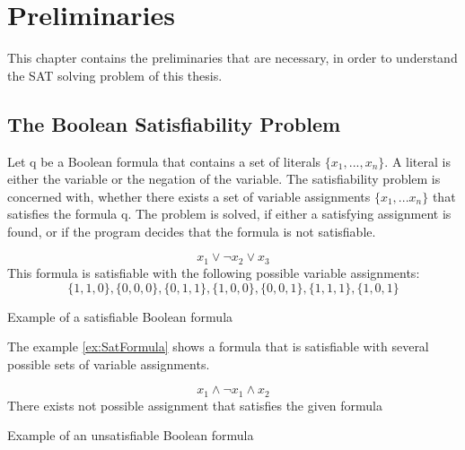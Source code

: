 
\chapter{Preliminaries}
\label{ch:Preliminaries}

This chapter contains the preliminaries that are necessary, in order to understand the SAT solving problem of this thesis.

\section{The Boolean Satisfiability Problem}
Let q be a Boolean formula that contains a set of literals $\{x_1,...,x_n\}$. A literal is either the variable or the negation of the variable. The satisfiability problem is concerned with, whether there exists a set of variable assignments $\{x_1,...x_n\}$ that satisfies the formula q. The problem is solved, if either a satisfying assignment is found, or if the program decides that the formula is not satisfiable. \cite{biere2009handbook}

\begin{example}
\begin{leftbar}
\begin{displaymath}
x_1 \vee \neg x_2 \vee x_3
\end{displaymath}
This formula is satisfiable with the following possible variable assignments:
\begin{displaymath}
\{1,1,0\},\{0,0,0\},\{0,1,1\},\{1,0,0\},\{0,0,1\},\{1,1,1\},\{1,0,1\}
\end{displaymath}
\end{leftbar}
\caption{Example of a satisfiable Boolean formula}
\label{ex:SatFormula}
\end{example}

The example \ref{ex:SatFormula} shows a formula that is satisfiable with several possible sets of variable assignments.

\begin{example}
\begin{leftbar}
\begin{displaymath}
x_1 \wedge \neg x_1 \wedge x_2
\end{displaymath}
There exists not possible assignment that satisfies the given formula
\end{leftbar}
\caption{Example of an unsatisfiable Boolean formula}
\label{ex:UnsatFormula}
\end{example}

